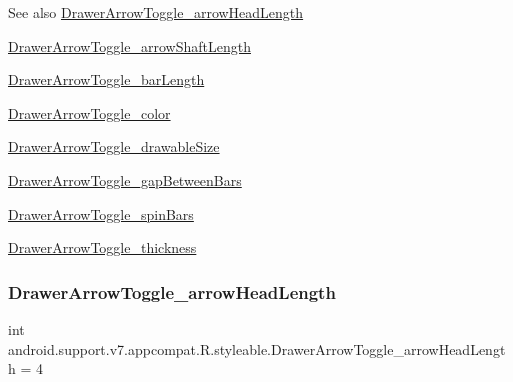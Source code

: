 \begin{DoxySeeAlso}{See also}
\hyperlink{classandroid_1_1support_1_1v7_1_1appcompat_1_1R_1_1styleable_a2761ca55152ffa3a51ad7b8eeae1c67d}{Drawer\+Arrow\+Toggle\+\_\+arrow\+Head\+Length} 

\hyperlink{classandroid_1_1support_1_1v7_1_1appcompat_1_1R_1_1styleable_a4b7bc95a81f9491de6faf46ff4f673b2}{Drawer\+Arrow\+Toggle\+\_\+arrow\+Shaft\+Length} 

\hyperlink{classandroid_1_1support_1_1v7_1_1appcompat_1_1R_1_1styleable_ae8ef18fa510292b2f8b05f36c70631bb}{Drawer\+Arrow\+Toggle\+\_\+bar\+Length} 

\hyperlink{classandroid_1_1support_1_1v7_1_1appcompat_1_1R_1_1styleable_a9cc1908fc44ebedfcf125c65a0ff5e0b}{Drawer\+Arrow\+Toggle\+\_\+color} 

\hyperlink{classandroid_1_1support_1_1v7_1_1appcompat_1_1R_1_1styleable_a579e9b0e2747d0ee8099120f0755be5e}{Drawer\+Arrow\+Toggle\+\_\+drawable\+Size} 

\hyperlink{classandroid_1_1support_1_1v7_1_1appcompat_1_1R_1_1styleable_a737c92b3ede20bdc07b042896c38c3c2}{Drawer\+Arrow\+Toggle\+\_\+gap\+Between\+Bars} 

\hyperlink{classandroid_1_1support_1_1v7_1_1appcompat_1_1R_1_1styleable_a22785cf0da7609e82faa84d7f2aa2f93}{Drawer\+Arrow\+Toggle\+\_\+spin\+Bars} 

\hyperlink{classandroid_1_1support_1_1v7_1_1appcompat_1_1R_1_1styleable_af9c043f5d15f590d94caaa0afa21c0dd}{Drawer\+Arrow\+Toggle\+\_\+thickness} 
\end{DoxySeeAlso}
\mbox{\label{classandroid_1_1support_1_1v7_1_1appcompat_1_1R_1_1styleable_a2761ca55152ffa3a51ad7b8eeae1c67d}} 
\subsubsection{\texorpdfstring{Drawer\+Arrow\+Toggle\+\_\+arrow\+Head\+Length}{DrawerArrowToggle\_arrowHeadLength}}
{\footnotesize\ttfamily int android.\+support.\+v7.\+appcompat.\+R.\+styleable.\+Drawer\+Arrow\+Toggle\+\_\+arrow\+Head\+Length = 4\hspace{0.3cm}{\ttfamily [static]}}

